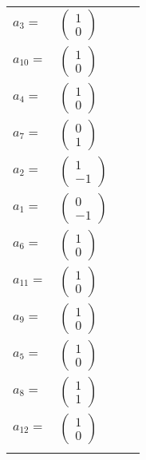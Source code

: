 \documentclass[1p]{elsarticle_modified}
\theoremstyle{definition}
\begin{document}
\begin{tabular}{m{7pt} m{180pt} m{7pt} m{180pt} }
\flushright $a_{3}=$&$\begin{pmatrix}1\\0\end{pmatrix}$ \\
\flushright $a_{10}=$&$\begin{pmatrix}1\\0\end{pmatrix}$ \\
\flushright $a_{4}=$&$\begin{pmatrix}1\\0\end{pmatrix}$ \\
\flushright $a_{7}=$&$\begin{pmatrix}0\\1\end{pmatrix}$ \\
\flushright $a_{2}=$&$\begin{pmatrix}1\\-1\end{pmatrix}$ \\
\flushright $a_{1}=$&$\begin{pmatrix}0\\-1\end{pmatrix}$ \\
\flushright $a_{6}=$&$\begin{pmatrix}1\\0\end{pmatrix}$ \\
\flushright $a_{11}=$&$\begin{pmatrix}1\\0\end{pmatrix}$ \\
\flushright $a_{9}=$&$\begin{pmatrix}1\\0\end{pmatrix}$ \\
\flushright $a_{5}=$&$\begin{pmatrix}1\\0\end{pmatrix}$ \\
\flushright $a_{8}=$&$\begin{pmatrix}1\\1\end{pmatrix}$ \\
\flushright $a_{12}=$&$\begin{pmatrix}1\\0\end{pmatrix}$\\&\end{tabular}
\end{document}
